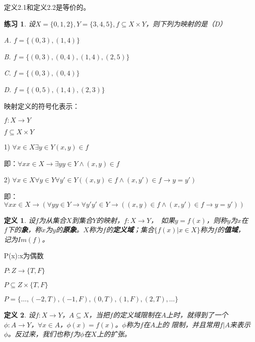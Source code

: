 \documentclass{article}
\newtheorem{Def}{定义}
\newtheorem{Exercise}{练习}
\begin{document}
\begin{CJK*}{UTF8}{gbsn}
  定义2.1和定义2.2是等价的。

    \begin{Exercise}
    设$X=\{0,1,2\}, Y= \{3,4,5\}, f\subseteq X \times Y$，则下列为映射的是（D）

    A. $f = \{(0,3), (1,4)\}$

    B. $f = \{(0,3), (0,4), (1,4),(2,5)\}$

    C. $f = \{(0,3), (0,4)\}$

    D. $f = \{(0,5), (1,4), (2,3)\}$
  \end{Exercise}

   映射定义的符号化表示：

  $f:X\to Y$
  
  $f\subseteq X\times Y$

  1) $\forall x \in X \exists y\in Y (x,y) \in f$

  即：$\forall x x \in X \to \exists y y\in Y \land (x,y) \in f$

  2) $\forall x \in X \forall y \in Y \forall y'\in Y ((x,y) \in f \land (x, y') \in f \to y = y')$

  即：$\forall x x \in X \to (\forall y y \in Y \to \forall y' y' \in Y \to ((x,y) \in f \land (x, y') \in f \to y = y'))$
    
 
  \begin{Def}
    设$f$为从集合$X$到集合$Y$的映射，$f:X\to Y$，　如果$y = f(x)$，则称$y$为$x$在$f$下的{\bfseries 象}，称$x$为$y$的{\bfseries 原象}。$X$称为$f$的{\bfseries 定义域}；集合$\{f(x) | x \in X\}$称为$f$的{\bfseries 值域}，记为$Im(f)$。
  \end{Def}

  P(x):x为偶数

$P:Z\to \{T,F\}$

$P\subseteq Z \times \{T,F\}$

$P=\{\ldots, (-2, T), (-1, F), (0, T), (1,F), (2,T), \ldots\}$


  \begin{Def}
    设$f:X\to Y$，$A\subseteq X$，当把$f$的定义域限制在$A$上时，就得到了一个
    $\phi: A\to Y$，$\forall x \in A$，$\phi(x) = f(x)$。$\phi$称为$f$在$A$上的
    限制，并且常用$f|A$来表示$\phi$。反过来，我们也称$f$为$\phi$在$X$上的扩张。
  \end{Def}


\end{CJK*}
\end{document}
